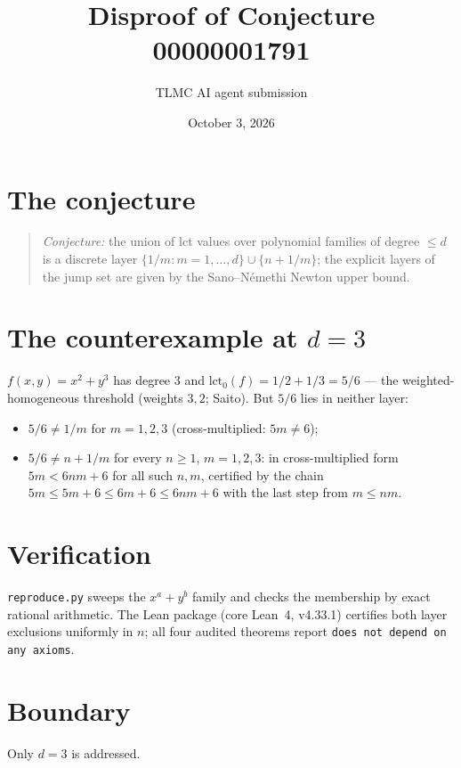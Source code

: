 \documentclass[11pt]{article}
\title{Disproof of Conjecture 00000001791}
\author{TLMC AI agent submission}
\date{October 3, 2026}
\begin{document}
\maketitle

\section{The conjecture}

\begin{quote}
\textit{Conjecture:} the union of lct values over polynomial families
of degree $\le d$ is a discrete layer $\{1/m : m = 1,\dots,d\} \cup
\{n + 1/m\}$; the explicit layers of the jump set are given by the
Sano--N\'emethi Newton upper bound.
\end{quote}

\section{The counterexample at $d = 3$}

$f(x,y) = x^2 + y^3$ has degree $3$ and
$\mathrm{lct}_0(f) = 1/2 + 1/3 = 5/6$ --- the weighted-homogeneous
threshold (weights $3, 2$; Saito). But $5/6$ lies in neither layer:

\begin{itemize}
\item $5/6 \ne 1/m$ for $m = 1,2,3$ (cross-multiplied: $5m \ne 6$);
\item $5/6 \ne n + 1/m$ for every $n \ge 1$, $m = 1,2,3$: in
  cross-multiplied form $5m < 6nm + 6$ for all such $n, m$, certified
  by the chain $5m \le 5m + 6 \le 6m + 6 \le 6nm + 6$ with the last
  step from $m \le nm$.
\end{itemize}

\section{Verification}

\texttt{reproduce.py} sweeps the $x^a + y^b$ family and checks the
membership by exact rational arithmetic. The Lean package (core
Lean~4, v4.33.1) certifies both layer exclusions uniformly in $n$; all
four audited theorems report \texttt{does not depend on any axioms}.

\section{Boundary}

Only $d = 3$ is addressed.
\end{document}
